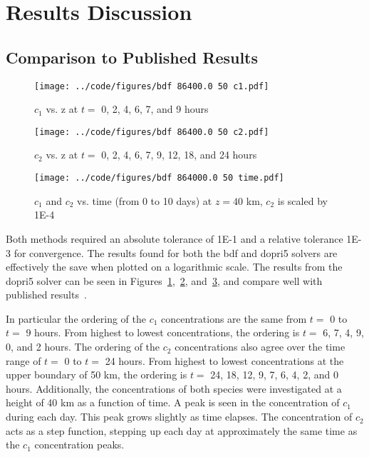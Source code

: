 \documentclass[twocolumn,10pt]{asme2ej}
\begin{document}
\section{Results Discussion}

\subsection{Comparison to Published Results}
\begin{figure}[tb]
\begin{center}
\texttt{[image: ../code/figures/bdf 86400.0 50 c1.pdf]}
\caption{$c_1$ vs. z at $t = $ 0, 2, 4, 6, 7, and 9 hours}
\label{c1_plot}
\end{center}
\end{figure}

\begin{figure}[tb]
\begin{center}
\texttt{[image: ../code/figures/bdf 86400.0 50 c2.pdf]}
\caption{$c_2$ vs. z at $t = $ 0, 2, 4, 6, 7, 9, 12, 18, and 24 hours}
\label{c2_plot}
\end{center}
\end{figure}

\begin{figure}[tb]
\begin{center}
\texttt{[image: ../code/figures/bdf 864000.0 50 time.pdf]}
\caption{$c_1$ and $c_2$ vs. time (from 0 to 10 days) at $z = 40$ km, $c_2$ is scaled by 1E-4}
\label{40km_plot}
\end{center}
\end{figure}

Both methods required an absolute tolerance of 1E-1 and a relative tolerance 1E-3 for convergence. The results found for both the bdf and dopri5 solvers are effectively the save when plotted on a logarithmic scale. The results from the dopri5 solver can be seen in Figures~\ref{c1_plot},~\ref{c2_plot}, and~\ref{40km_plot}, and compare well with published results~\cite{chang1974simulation, byrne1987stiff}.

In particular the ordering of the $c_1$ concentrations are the same from $t = $ 0 to $t = $ 9 hours. From highest to lowest concentrations, the ordering is $t = $ 6, 7, 4, 9, 0, and 2 hours. The ordering of the $c_2$ concentrations also agree over the time range of $t = $ 0 to $t = $ 24 hours. From highest to lowest concentrations at the upper boundary of 50 km, the ordering is $t = $ 24, 18, 12, 9, 7, 6, 4, 2, and 0 hours. Additionally, the concentrations of both species were investigated at a height of 40 km as a function of time. A peak is seen in the concentration of $c_1$ during each day. This peak grows slightly as time elapses. The concentration of $c_2$ acts as a step function, stepping up each day at approximately the same time as the $c_1$ concentration peaks.
\end{document}
